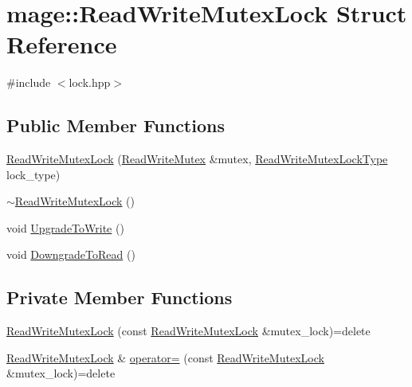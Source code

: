 \hypertarget{structmage_1_1_read_write_mutex_lock}{}\section{mage\+:\+:Read\+Write\+Mutex\+Lock Struct Reference}
\label{structmage_1_1_read_write_mutex_lock}


{\ttfamily \#include $<$lock.\+hpp$>$}

\subsection*{Public Member Functions}
\begin{DoxyCompactItemize}
\item 
\hyperlink{structmage_1_1_read_write_mutex_lock_a323e2f45646caa23c4ee21452c8f8d4a}{Read\+Write\+Mutex\+Lock} (\hyperlink{classmage_1_1_read_write_mutex}{Read\+Write\+Mutex} \&mutex, \hyperlink{namespacemage_afd76fcca37ce5c5b2227671290973c74}{Read\+Write\+Mutex\+Lock\+Type} lock\+\_\+type)
\item 
\hyperlink{structmage_1_1_read_write_mutex_lock_a64b600234d29ba7307fcd77a17486582}{$\sim$\+Read\+Write\+Mutex\+Lock} ()
\item 
void \hyperlink{structmage_1_1_read_write_mutex_lock_a01843784e8dbf0d3dfd6100562f699be}{Upgrade\+To\+Write} ()
\item 
void \hyperlink{structmage_1_1_read_write_mutex_lock_ad3292e579d09107c7361989657b9bade}{Downgrade\+To\+Read} ()
\end{DoxyCompactItemize}
\subsection*{Private Member Functions}
\begin{DoxyCompactItemize}
\item 
\hyperlink{structmage_1_1_read_write_mutex_lock_a2c9cd6329bfd18c4752235ebee7edb4a}{Read\+Write\+Mutex\+Lock} (const \hyperlink{structmage_1_1_read_write_mutex_lock}{Read\+Write\+Mutex\+Lock} \&mutex\+\_\+lock)=delete
\item 
\hyperlink{structmage_1_1_read_write_mutex_lock}{Read\+Write\+Mutex\+Lock} \& \hyperlink{structmage_1_1_read_write_mutex_lock_ade82a57f337e39a1515f67fbc1f6fc43}{operator=} (const \hyperlink{structmage_1_1_read_write_mutex_lock}{Read\+Write\+Mutex\+Lock} \&mutex\+\_\+lock)=delete
\end{DoxyCompactItemize}
